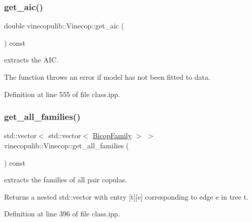 \subsubsection{\texorpdfstring{get\+\_\+aic()}{get\_aic()}}
{\footnotesize\ttfamily double vinecopulib\+::\+Vinecop\+::get\+\_\+aic (\begin{DoxyParamCaption}{ }\end{DoxyParamCaption}) const\hspace{0.3cm}{\ttfamily [inline]}}



extracts the A\+IC. 

The function throws an error if model has not been fitted to data. 

Definition at line 555 of file class.\+ipp.

\mbox{\label{classvinecopulib_1_1_vinecop_ab8a6a5d111b80788955438e1630f04c9}} 
\subsubsection{\texorpdfstring{get\+\_\+all\+\_\+families()}{get\_all\_families()}}
{\footnotesize\ttfamily std\+::vector$<$ std\+::vector$<$ \hyperlink{namespacevinecopulib_a42e95cc06d33896199caab0c11ad44f3}{Bicop\+Family} $>$ $>$ vinecopulib\+::\+Vinecop\+::get\+\_\+all\+\_\+families (\begin{DoxyParamCaption}{ }\end{DoxyParamCaption}) const\hspace{0.3cm}{\ttfamily [inline]}}



extracts the families of all pair copulas. 

\begin{DoxyReturn}{Returns}
a nested std\+::vector with entry {\ttfamily \mbox{[}t\mbox{]}\mbox{[}e\mbox{]}} corresponding to edge {\ttfamily e} in tree {\ttfamily t}. 
\end{DoxyReturn}


Definition at line 396 of file class.\+ipp.

\mbox{\label{classvinecopulib_1_1_vinecop_a5f1c76c0fd97ea586b182f7996034e86}} 
